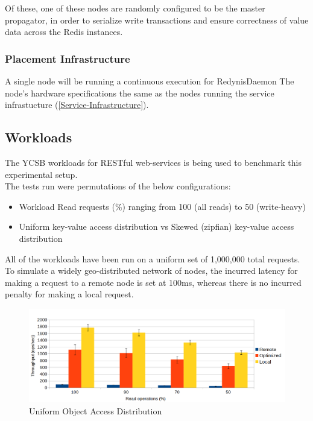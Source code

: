 \documentclass{sig-alternate}
\begin{document}
Of these, one of these nodes are randomly configured to be the master propagator, in order to serialize write transactions and ensure correctness of value data across the Redis instances.\\

\subsubsection{Placement Infrastructure}
A single node will be running a continuous execution for RedynisDaemon \cite{redynis-daemon}
The node's hardware specifications the same as the nodes running the service infrastucture (\ref{Service-Infrastructure}).\\

\subsection{Workloads}
The YCSB workloads for RESTful web-services is being used to benchmark this experimental setup.\\

The tests run were permutations of the below configurations:

\begin{itemize}
	\item  Workload Read requests (\%) ranging from 100 (all reads) to 50 (write-heavy)
	\item  Uniform key-value access distribution vs Skewed (zipfian) key-value access distribution
\end{itemize}

All of the workloads have been run on a uniform set of 1,000,000 total requests. To simulate a widely geo-distributed network of nodes, the incurred latency for making a request to a remote node is set at 100ms\cite{latency-stats}, whereas there is no incurred penalty for making a local request.\\


\begin{figure}[ht]
\centering
\includegraphics[width=\textwidth]{images/Uniform-dist-throughput.png}
\caption{Uniform Object Access Distribution}
\label{fig:res-unif}
\end{figure}
\end{document}
